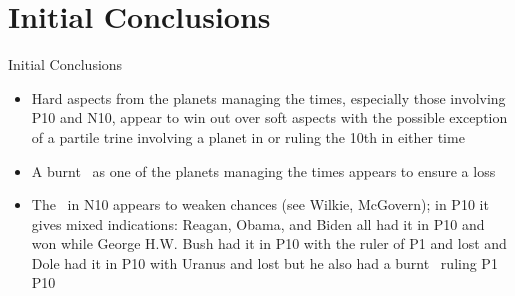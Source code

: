 \section{Initial Conclusions}
\begin{frame}[t]{Initial Conclusions}
\centering
\begin{minipage}{0.9\textwidth}
\begin{itemize}
\item Hard aspects from the planets managing the times, especially those involving P10 and N10, appear to win out over soft aspects with the possible exception of a partile trine involving a planet in or ruling the 10th in either time
\vspace{0.5em}

\item A burnt \Mercury\, as one of the planets managing the times appears to ensure a loss
\vspace{0.5em}

\item The \SouthNode\, in N10 appears to weaken chances (see Wilkie, McGovern); in P10 it gives mixed indications: Reagan, Obama, and Biden all had it in P10 and won while George H.W. Bush had it in P10 with the ruler of P1 and lost and Dole had it in P10 with Uranus and lost but he also had a burnt \Mercury\, ruling P1 \Trine\, P10
\end{itemize}
\end{minipage}
\end{frame}